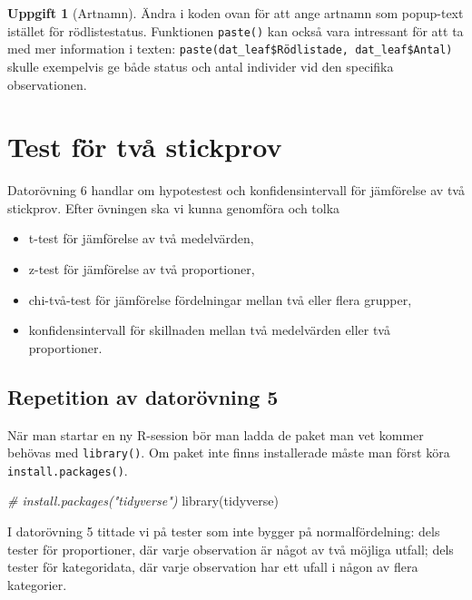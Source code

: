 \documentclass[
]{book}
\newenvironment{Shaded}{\begin{snugshade}}{\end{snugshade}}
\newcommand{\CommentTok}[1]{\textcolor[rgb]{0.56,0.35,0.01}{\textit{#1}}}
\newcommand{\FunctionTok}[1]{\textcolor[rgb]{0.00,0.00,0.00}{#1}}
\newcommand{\NormalTok}[1]{#1}
\theoremstyle{definition}
\theoremstyle{definition}
\theoremstyle{definition}
\newtheorem{exercise}{Uppgift}[chapter]
\theoremstyle{definition}
\theoremstyle{remark}
\begin{document}
\begin{exercise}[Artnamn]
Ändra i koden ovan för att ange artnamn som popup-text istället för rödlistestatus. Funktionen \texttt{paste()} kan också vara intressant för att ta med mer information i texten: \texttt{paste(dat\_leaf\$Rödlistade,\ dat\_leaf\$Antal)} skulle exempelvis ge både status och antal individer vid den specifika observationen.
\end{exercise}

\hypertarget{test-fuxf6r-tvuxe5-stickprov}{%
\chapter{Test för två stickprov}\label{test-fuxf6r-tvuxe5-stickprov}}

Datorövning 6 handlar om hypotestest och konfidensintervall för jämförelse av två stickprov. Efter övningen ska vi kunna genomföra och tolka

\begin{itemize}
\item
  t-test för jämförelse av två medelvärden,
\item
  z-test för jämförelse av två proportioner,
\item
  chi-två-test för jämförelse fördelningar mellan två eller flera grupper,
\item
  konfidensintervall för skillnaden mellan två medelvärden eller två proportioner.
\end{itemize}

\hypertarget{repetition-av-datoruxf6vning-5}{%
\section{Repetition av datorövning 5}\label{repetition-av-datoruxf6vning-5}}

När man startar en ny R-session bör man ladda de paket man vet kommer behövas med \texttt{library()}. Om paket inte finns installerade måste man först köra \texttt{install.packages()}.

\begin{Shaded}
\begin{Highlighting}[]
\CommentTok{\# install.packages("tidyverse")}
\FunctionTok{library}\NormalTok{(tidyverse)}
\end{Highlighting}
\end{Shaded}

I datorövning 5 tittade vi på tester som inte bygger på normalfördelning: dels tester för proportioner, där varje observation är något av två möjliga utfall; dels tester för kategoridata, där varje observation har ett ufall i någon av flera kategorier.
\end{document}
